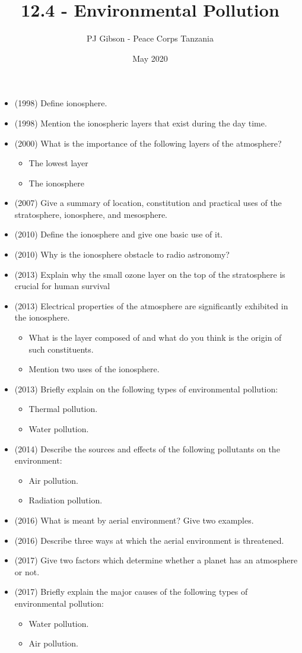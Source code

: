 \documentclass{article}
\title{\textbf{12.4 - Environmental Pollution}}
\author{PJ Gibson - Peace Corps Tanzania}
\date{May 2020}
\begin{document}
\maketitle

\begin{itemize}
\item (1998)  Define ionosphere.
\item (1998)  Mention the ionospheric layers that exist during the day time.
\item (2000)  What is the importance of the following layers of the atmosphere?
 \begin{itemize}
\item The lowest layer
\item The ionosphere
\end{itemize}
\item (2007)  Give a summary of location, constitution and practical uses of the stratosphere, ionosphere, and mesosphere.
\item (2010)  Define the ionosphere and give one basic use of it.
\item (2010)  Why is the ionosphere obstacle to radio astronomy?
\item (2013)  Explain why the small ozone layer on the top of the stratosphere is crucial for human survival
\item (2013)  Electrical properties of the atmosphere are significantly exhibited in the ionosphere.
 \begin{itemize}
\item  What is the layer composed of and what do you think is the origin of such constituents.
\item  Mention two uses of the ionosphere.
\end{itemize}
\item (2013)  Briefly explain on the following types of environmental pollution:
 \begin{itemize}
\item  Thermal pollution.
\item  Water pollution.
\end{itemize}
\item (2014)  Describe the sources and effects of the following pollutants on the environment:
 \begin{itemize}
\item Air pollution. 
\item Radiation pollution.
\end{itemize}
\item (2016)  What is meant by aerial environment?  Give two examples.
\item (2016)  Describe three ways at which the aerial environment is threatened.
\item (2017)  Give two factors which determine whether a planet has an atmosphere or not.
\item (2017)  Briefly explain the major causes of the following types of environmental pollution:
 \begin{itemize}
\item Water pollution. 
\item  Air pollution.
\end{itemize}

\end{itemize}
\end{document}
